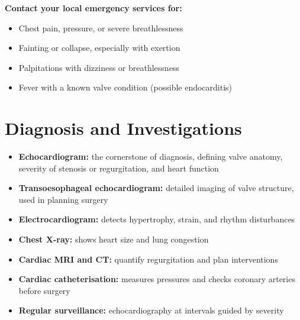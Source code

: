 \textbf{Contact your local emergency services for:}
\begin{itemize}
    \item Chest pain, pressure, or severe breathlessness
    \item Fainting or collapse, especially with exertion
    \item Palpitations with dizziness or breathlessness
    \item Fever with a known valve condition (possible endocarditis)
\end{itemize}

\section*{Diagnosis and Investigations}
\begin{itemize}
    \item \textbf{Echocardiogram:} the cornerstone of diagnosis, defining valve anatomy, severity of stenosis or regurgitation, and heart function
    \item \textbf{Transoesophageal echocardiogram:} detailed imaging of valve structure, used in planning surgery
    \item \textbf{Electrocardiogram:} detects hypertrophy, strain, and rhythm disturbances
    \item \textbf{Chest X-ray:} shows heart size and lung congestion
    \item \textbf{Cardiac MRI and CT:} quantify regurgitation and plan interventions
    \item \textbf{Cardiac catheterisation:} measures pressures and checks coronary arteries before surgery
    \item \textbf{Regular surveillance:} echocardiography at intervals guided by severity
\end{itemize}

